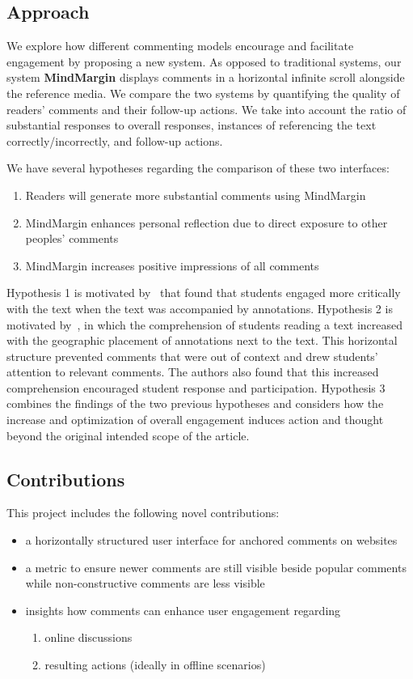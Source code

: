\subsection{Approach}

We explore how different commenting models encourage and facilitate engagement by proposing a new system. As opposed to traditional systems, our system \textbf{MindMargin} displays comments in a horizontal infinite scroll alongside the reference media. We compare the two systems by quantifying the quality of readers' comments and their follow-up actions. We take into account the ratio of substantial responses to overall responses, instances of referencing the text correctly/incorrectly, and follow-up actions.

We have several hypotheses regarding the comparison of these two interfaces:
\begin{enumerate}
\item Readers will generate more substantial comments using MindMargin
\item MindMargin enhances personal reflection due to direct exposure to other peoples' comments
\item MindMargin increases positive impressions of all comments
\end{enumerate}

Hypothesis 1 is motivated by~\cite{AnnotationsStudents} that found that students engaged more critically with the text when the text was accompanied by annotations. 
Hypothesis 2 is motivated by~\cite{NB}, in which the comprehension of students reading a text increased with the geographic placement of annotations next to the text. This horizontal structure prevented comments that were out of context and drew students' attention to relevant comments. The authors also found that this increased comprehension encouraged student response and participation.
Hypothesis 3 combines the findings of the two previous hypotheses and considers how the increase and optimization of overall engagement induces action and thought beyond the original intended scope of the article. 

\subsection{Contributions}

This project includes the following novel contributions:

\begin{itemize}
\item a horizontally structured user interface for anchored comments on websites
\item a metric to ensure newer comments are still visible beside popular comments while non-constructive comments are less visible
\item insights how comments can enhance user engagement regarding
\begin{enumerate}
\item online discussions
\item resulting actions (ideally in offline scenarios)
\end{enumerate}

\end{itemize}